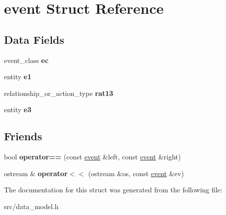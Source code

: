 \hypertarget{structevent}{}\section{event Struct Reference}
\label{structevent}
\subsection*{Data Fields}
\begin{DoxyCompactItemize}
\item 
\mbox{\label{structevent_ac32b92ff80a203fd7c27e7313e4429d2}} 
event\+\_\+class {\bfseries ec}
\item 
\mbox{\label{structevent_a829a8f5791c5189324ffa115608f20ee}} 
entity {\bfseries e1}
\item 
\mbox{\label{structevent_a4bf1c0667655028954126c33657330c9}} 
relationship\+\_\+or\+\_\+action\+\_\+type {\bfseries rat13}
\item 
\mbox{\label{structevent_ac7c3b30ab1c81bece0be283c615a7015}} 
entity {\bfseries e3}
\end{DoxyCompactItemize}
\subsection*{Friends}
\begin{DoxyCompactItemize}
\item 
\mbox{\label{structevent_a3dd0c9c41d63a2d2171cffc7dfa14d6c}} 
bool {\bfseries operator==} (const \hyperlink{structevent}{event} \&left, const \hyperlink{structevent}{event} \&right)
\item 
\mbox{\label{structevent_a4d697ad127dbb87399c435f1e216ec8a}} 
ostream \& {\bfseries operator$<$$<$} (ostream \&os, const \hyperlink{structevent}{event} \&ev)
\end{DoxyCompactItemize}


The documentation for this struct was generated from the following file\+:\begin{DoxyCompactItemize}
\item 
src/data\+\_\+model.\+h\end{DoxyCompactItemize}
